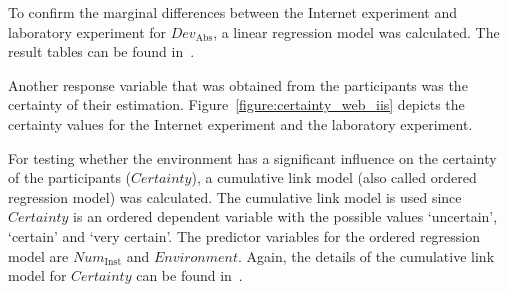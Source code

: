 To confirm the marginal differences between the Internet experiment and laboratory experiment for $\textit{Dev}_{\mathrm{Abs}}$, a linear regression model was calculated.
The result tables can be found in~\cite{schoeffler13}.

Another response variable that was obtained from the participants was the certainty of their estimation. Figure~\ref{figure:certainty_web_iis} depicts the certainty values for the Internet experiment and the laboratory experiment.

For testing whether the environment has a significant influence on the certainty of the participants ($\textit{Certainty}$), a cumulative link model (also called ordered regression model) was calculated\cite{Christensen2012}. The cumulative link model is used since $\textit{Certainty}$ is an ordered dependent variable with the possible values `uncertain', `certain' and `very certain'. The predictor variables for the ordered regression model are $\textit{Num}_{\mathrm{Inst}}$ and $\textit{Environment}$. Again, the details of the cumulative link model for $\textit{Certainty}$ can be found in~\cite{schoeffler13}.


